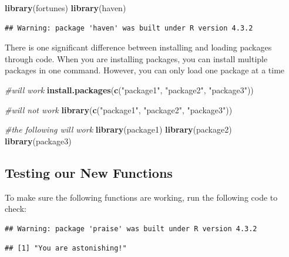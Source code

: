 \documentclass[
]{book}
\newenvironment{Shaded}{\begin{snugshade}}{\end{snugshade}}
\newcommand{\CommentTok}[1]{\textcolor[rgb]{0.56,0.35,0.01}{\textit{#1}}}
\newcommand{\FunctionTok}[1]{\textcolor[rgb]{0.13,0.29,0.53}{\textbf{#1}}}
\newcommand{\NormalTok}[1]{#1}
\newcommand{\StringTok}[1]{\textcolor[rgb]{0.31,0.60,0.02}{#1}}
\begin{document}
\begin{Shaded}
\begin{Highlighting}[]
\FunctionTok{library}\NormalTok{(fortunes)}
\FunctionTok{library}\NormalTok{(haven)}
\end{Highlighting}
\end{Shaded}

\begin{verbatim}
## Warning: package 'haven' was built under R version 4.3.2
\end{verbatim}

There is one significant difference between installing and loading packages through code. When you are installing packages, you can install multiple packages in one command. However, you can only load one package at a time

\begin{Shaded}
\begin{Highlighting}[]
\CommentTok{\#will work}
\FunctionTok{install.packages}\NormalTok{(}\FunctionTok{c}\NormalTok{(}\StringTok{"package1"}\NormalTok{, }\StringTok{"package2"}\NormalTok{, }\StringTok{"package3"}\NormalTok{)) }


\CommentTok{\#will not work}
\FunctionTok{library}\NormalTok{(}\FunctionTok{c}\NormalTok{(}\StringTok{"package1"}\NormalTok{, }\StringTok{"package2"}\NormalTok{, }\StringTok{"package3"}\NormalTok{)) }

\CommentTok{\#the following will work}
\FunctionTok{library}\NormalTok{(package1)}
\FunctionTok{library}\NormalTok{(package2)}
\FunctionTok{library}\NormalTok{(package3)}
\end{Highlighting}
\end{Shaded}

\hypertarget{testing-our-new-functions}{%
\subsection{Testing our New Functions}\label{testing-our-new-functions}}

To make sure the following functions are working, run the following code to check:

\begin{verbatim}
## Warning: package 'praise' was built under R version 4.3.2
\end{verbatim}

\begin{verbatim}
## [1] "You are astonishing!"
\end{verbatim}
\end{document}
